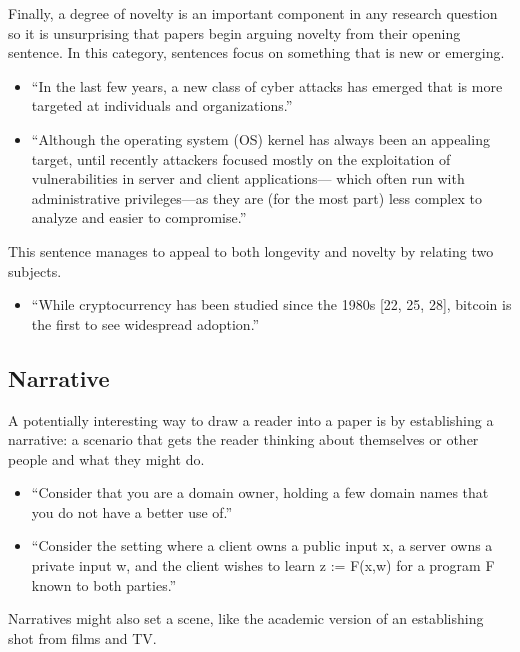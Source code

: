 \documentclass[sigconf]{acmart}
\begin{document}
	Finally, a degree of novelty is an important component in any research question so it is unsurprising that papers begin arguing novelty from their opening sentence. In this category, sentences focus on something that is new or emerging.
	\begin{itemize}
		\item 	``In the last few years, a new class of cyber attacks has emerged that is more targeted at individuals and organizations.''~\cite{le2014look}

		\item  ``Although the operating system (OS) kernel has always been an appealing target, until recently attackers focused mostly on the exploitation of vulnerabilities in server and client applications— which often run with administrative privileges—as they are (for the most part) less complex to analyze and easier to compromise.''~\cite{kemerlis2014ret2dir}
	\end{itemize}

	This sentence manages to appeal to both longevity and novelty by relating two subjects.
	\begin{itemize}

		\item  ``While cryptocurrency has been studied since the 1980s [22, 25, 28], bitcoin is the first to see widespread adoption.''~\cite{heilman2015eclipse}

	\end{itemize}

	\subsection{Narrative}

	A potentially interesting way to draw a reader into a paper is by establishing a narrative: a scenario that gets the reader thinking about themselves or other people and what they might do.
	\begin{itemize}
		\item 	``Consider that you are a domain owner, holding a few domain names that you do not have a better use of.''~\cite{alrwais2014understanding}

		\item 	``Consider the setting where a client owns a public input x, a server owns a private input w, and the client wishes to learn z := F(x,w) for a program F known to both parties.''~\cite{ben2014succinct}
	\end{itemize}

	Narratives might also set a scene, like the academic version of an establishing shot from films and TV.
\end{document}
